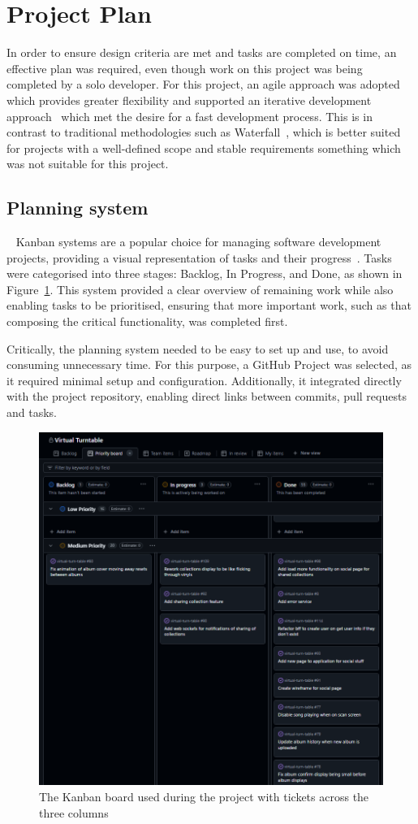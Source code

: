 \section{Project Plan}
In order to ensure design criteria are met and tasks are completed on time, an effective plan was required, even though work on this project was being completed by a solo developer. For this project, an agile approach was adopted which provides greater flexibility and supported an iterative development approach~\cite{agile_software_development} which met the desire for a fast development process. This is in contrast to traditional methodologies such as Waterfall~\cite{5222784}, which is better suited for projects with a well-defined scope and stable requirements something which was not suitable for this project.

\subsection{Planning system}~\label{sec:plan-system}
Kanban systems are a popular choice for managing software development projects, providing a visual representation of tasks and their progress~\cite{5773404}. Tasks were categorised into three stages: Backlog, In Progress, and Done, as shown in Figure~\ref{fig:kanban-board}. This system provided a clear overview of remaining work while also enabling tasks to be prioritised, ensuring that more important work, such as that composing the critical functionality, was completed first.

Critically, the planning system needed to be easy to set up and use, to avoid consuming unnecessary time. For this purpose, a GitHub Project was selected, as it required minimal setup and configuration. Additionally, it integrated directly with the project repository, enabling direct links between commits, pull requests and tasks.

\begin{figure}
    \centering
    \includegraphics[width=0.65\linewidth]{figures/kanban_board.png}
    \captionsetup{justification=centering,margin=2cm}
    \caption{The Kanban board used during the project with tickets across the three columns}
    \label{fig:kanban-board}
\end{figure}

